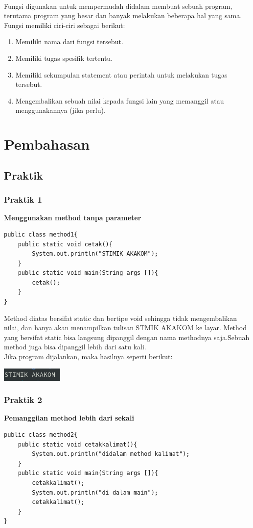 \documentclass[a4paper,12pt]{article}
\begin{document}
\paragraph{}
Fungsi digunakan untuk mempermudah didalam membuat sebuah program, terutama
program yang besar dan banyak melakukan beberapa hal yang sama. Fungsi memiliki ciri-ciri
sebagai berikut:
\begin{enumerate}
    \item Memiliki nama dari fungsi tersebut.
    \item Memiliki tugas spesifik tertentu.
    \item Memiliki sekumpulan statement atau perintah untuk melakukan tugas tersebut.
    \item Mengembalikan sebuah nilai kepada fungsi lain yang memanggil atau menggunakannya (jika perlu).
\end{enumerate}
\newpage

\section{Pembahasan}
\subsection{Praktik}
\subsubsection{Praktik 1}
\textbf{Menggunakan method tanpa parameter}
\begin{lstlisting}
public class method1{
	public static void cetak(){
		System.out.println("STIMIK AKAKOM");
	}
	public static void main(String args []){
		cetak();
	}
}
\end{lstlisting}
Method diatas bersifat static dan bertipe void sehingga tidak mengembalikan nilai, dan hanya akan menampilkan tulisan
STMIK AKAKOM ke layar. Method yang bersifat static bisa langsung dipanggil dengan nama methodnya saja.Sebuah method juga
bisa dipanggil lebih dari satu kali.\\

Jika program dijalankan, maka hasilnya seperti berikut:
\begin{center}
    \includegraphics{1.png} 
\end{center}

\subsubsection{Praktik 2}
\textbf{Pemanggilan method lebih dari sekali}
\begin{lstlisting}
public class method2{
	public static void cetakkalimat(){
		System.out.println("didalam method kalimat");
	}
	public static void main(String args []){
		cetakkalimat();
		System.out.println("di dalam main");
		cetakkalimat();
	}
}
\end{lstlisting}
\end{document}
